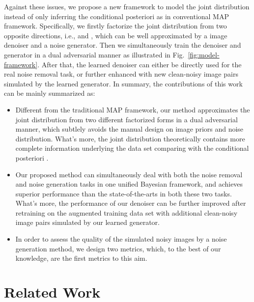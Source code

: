 \documentclass[runningheads]{llncs}
\begin{document}
Against these issues, we propose a new framework to model the joint distribution  instead
of only inferring the conditional posteriori  as in conventional MAP framework. Specifically,
we firstly factorize the joint distribution  from two opposite directions,
i.e.,  and ,
which  can be well approximated by a image denoiser and a noise generator. Then we simultaneously train the denoiser 
and generator in a dual adversarial manner as illustrated in Fig.~\ref{fig:model-framework}. After that, the learned denoiser can either be directly
used for the real noise removal task, or further enhanced with new clean-noisy image pairs simulated by the learned generator.
In summary, the contributions of this work can be mainly summarized as:
\begin{itemize}
    \item Different from the traditional MAP framework, our method approximates
        the joint distribution  from two different factorized forms in a dual adversarial manner,
        which subtlely avoids the manual design on image priors and noise distribution. What's more, the joint distribution
        theoretically contains more complete information underlying the data set comparing with the conditional posteriori .
    \item Our proposed method can simultaneously deal with both the noise removal and noise generation tasks in
        one unified Bayesian framework, and achieves superior performance than the state-of-the-arts
        in both these two tasks. What's more, the performance of our denoiser can be further improved
        after retraining on the augmented training data set with additional clean-noisy image pairs simulated
        by our learned generator.
    \item In order to assess the quality of the simulated noisy images by a noise generation method, we design
        two metrics, which, to the best of our knowledge, are the first metrics to this aim.
\end{itemize}

\section{Related Work}
\end{document}
